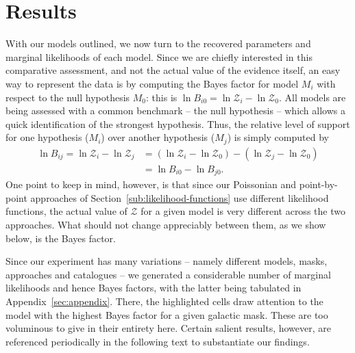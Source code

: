 \documentclass[fleqn,usenatbib]{mnras}
\begin{document}
\section{Results}
\label{sec:results}
    With our models outlined, we now turn to the recovered parameters and marginal likelihoods of each model.
    Since we are chiefly interested in this comparative assessment, and not the actual value of the evidence itself, an easy way to represent the data is by computing the Bayes factor for model $M_i$ with respect to the null hypothesis $M_0$: this is $\ln B_{i0} = \ln \mathcal{Z}_i - \ln \mathcal{Z}_0$.
    All models are being assessed with a common benchmark -- the null hypothesis -- which allows a quick identification of the strongest hypothesis.
    Thus, the relative level of support for one hypothesis ($M_i$) over another hypothesis ($M_j$) is simply computed by
        \begin{align}
            \ln B_{ij} = \ln \mathcal{Z}_i - \ln \mathcal{Z}_j &= (\ln \mathcal{Z}_i - \ln \mathcal{Z}_0 ) - (\ln \mathcal{Z}_j - \ln \mathcal{Z}_0) \\
            &= \ln B_{i0} - \ln B_{j0}.
        \end{align}
    One point to keep in mind, however, is that since our Poissonian and point-by-point approaches of Section~\ref{sub:likelihood-functions} use different likelihood functions, the actual value of $\mathcal{Z}$ for a given model is very different across the two approaches.
    What should not change appreciably between them, as we show below, is the Bayes factor.
    
    Since our experiment has many variations -- namely different models, masks, approaches and catalogues -- we generated a considerable number of marginal likelihoods and hence Bayes factors, with the latter being tabulated in Appendix~\ref{sec:appendix}.
    There, the highlighted cells draw attention to the model with the highest Bayes factor for a given galactic mask.
    These are too voluminous to give in their entirety here.
    Certain salient results, however, are referenced periodically in the following text to substantiate our findings.
\end{document}
